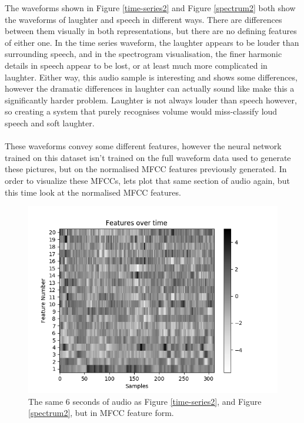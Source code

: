 \documentclass[a4paper,11pt,notitlepage]{article}
\begin{document}
\noindent
The waveforms shown in Figure \ref{time-series2} and Figure \ref{spectrum2} both show the waveforms of laughter and speech in different ways. There are differences between them visually in both representations, but there are no defining features of either one. In the time series waveform, the laughter appears to be louder than surrounding speech, and in the spectrogram visualisation, the finer harmonic details in speech appear to be lost, or at least much more complicated in laughter. Either way, this audio sample is interesting and shows some differences, however the dramatic differences in laughter can actually sound like make this a significantly harder problem. Laughter is not always louder than speech however, so creating a system that purely recognises volume would miss-classify loud speech and soft laughter.\\
\\
These waveforms convey some different features, however the neural network trained on this dataset isn't trained on the full waveform data used to generate these pictures, but on the normalised MFCC features previously generated. In order to visualize these MFCCs, lets plot that same section of audio again, but this time look at the normalised MFCC features.

\begin{figure}[H]
	\centering
	\vspace{0.5cm}
	\includegraphics[scale = 0.8]{figs/features_visualisation_grey.png}
	\caption{The same 6 seconds of audio as Figure \ref{time-series2}, and Figure \ref{spectrum2}, but in MFCC feature form.}
	\label{mfcc-visualisation}
\end{figure}
\end{document}
